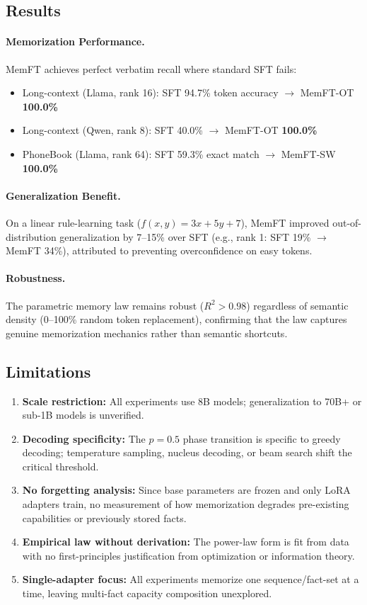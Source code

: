 \documentclass[11pt,a4paper]{article}
\begin{document}
\subsection{Results}

\paragraph{Memorization Performance.} MemFT achieves perfect verbatim recall where standard SFT fails:
\begin{itemize}
\item Long-context (Llama, rank 16): SFT 94.7\% token accuracy $\to$ MemFT-OT \textbf{100.0\%}
\item Long-context (Qwen, rank 8): SFT 40.0\% $\to$ MemFT-OT \textbf{100.0\%}
\item PhoneBook (Llama, rank 64): SFT 59.3\% exact match $\to$ MemFT-SW \textbf{100.0\%}
\end{itemize}

\paragraph{Generalization Benefit.} On a linear rule-learning task ($f(x,y) = 3x + 5y + 7$), MemFT improved out-of-distribution generalization by 7--15\% over SFT (e.g., rank 1: SFT 19\% $\to$ MemFT 34\%), attributed to preventing overconfidence on easy tokens.

\paragraph{Robustness.} The parametric memory law remains robust ($R^2 > 0.98$) regardless of semantic density (0--100\% random token replacement), confirming that the law captures genuine memorization mechanics rather than semantic shortcuts.

\subsection{Limitations}

\begin{enumerate}
\item \textbf{Scale restriction:} All experiments use 8B models; generalization to 70B+ or sub-1B models is unverified.
\item \textbf{Decoding specificity:} The $p = 0.5$ phase transition is specific to greedy decoding; temperature sampling, nucleus decoding, or beam search shift the critical threshold.
\item \textbf{No forgetting analysis:} Since base parameters are frozen and only LoRA adapters train, no measurement of how memorization degrades pre-existing capabilities or previously stored facts.
\item \textbf{Empirical law without derivation:} The power-law form is fit from data with no first-principles justification from optimization or information theory.
\item \textbf{Single-adapter focus:} All experiments memorize one sequence/fact-set at a time, leaving multi-fact capacity composition unexplored.
\end{enumerate}
\end{document}
